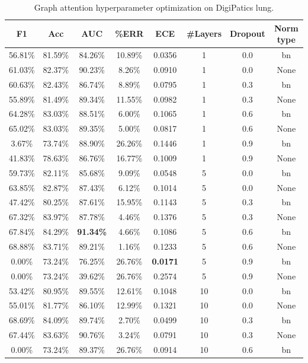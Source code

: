 \begin{table}[ht]
    \centering
    \caption{Graph attention hyperparameter optimization on DigiPatics lung.}
\begin{tabular}{|c|c|c|c|c|c|c|c|}
\hline
F1 & Acc & AUC & \%ERR & ECE & \#Layers & Dropout & Norm type\\ \hline
56.81\% & 81.59\% & 84.26\% & 10.89\% & 0.0356 & 1 & 0.0 & bn\\ \hline
61.03\% & 82.37\% & 90.23\% & 8.26\% & 0.0910 & 1 & 0.0 & None\\ \hline
60.63\% & 82.43\% & 86.74\% & 8.89\% & 0.0795 & 1 & 0.3 & bn\\ \hline
55.89\% & 81.49\% & 89.34\% & 11.55\% & 0.0982 & 1 & 0.3 & None\\ \hline
64.28\% & 83.03\% & 88.51\% & 6.00\% & 0.1065 & 1 & 0.6 & bn\\ \hline
65.02\% & 83.03\% & 89.35\% & 5.00\% & 0.0817 & 1 & 0.6 & None\\ \hline
3.67\% & 73.74\% & 88.90\% & 26.26\% & 0.1446 & 1 & 0.9 & bn\\ \hline
41.83\% & 78.63\% & 86.76\% & 16.77\% & 0.1009 & 1 & 0.9 & None\\ \hline
59.73\% & 82.11\% & 85.68\% & 9.09\% & 0.0548 & 5 & 0.0 & bn\\ \hline
63.85\% & 82.87\% & 87.43\% & 6.12\% & 0.1014 & 5 & 0.0 & None\\ \hline
47.42\% & 80.25\% & 87.61\% & 15.95\% & 0.1143 & 5 & 0.3 & bn\\ \hline
67.32\% & 83.97\% & 87.78\% & 4.46\% & 0.1376 & 5 & 0.3 & None\\ \hline
67.84\% & 84.29\% & \textbf{91.34\%} & 4.66\% & 0.1086 & 5 & 0.6 & bn\\ \hline
68.88\% & 83.71\% & 89.21\% & 1.16\% & 0.1233 & 5 & 0.6 & None\\ \hline
0.00\% & 73.24\% & 76.25\% & 26.76\% & \textbf{0.0171} & 5 & 0.9 & bn\\ \hline
0.00\% & 73.24\% & 39.62\% & 26.76\% & 0.2574 & 5 & 0.9 & None\\ \hline
53.42\% & 80.95\% & 89.55\% & 12.61\% & 0.1048 & 10 & 0.0 & bn\\ \hline
55.01\% & 81.77\% & 86.10\% & 12.99\% & 0.1321 & 10 & 0.0 & None\\ \hline
68.69\% & 84.09\% & 89.74\% & 2.70\% & 0.0499 & 10 & 0.3 & bn\\ \hline
67.44\% & 83.63\% & 90.76\% & 3.24\% & 0.0791 & 10 & 0.3 & None\\ \hline
0.00\% & 73.24\% & 89.37\% & 26.76\% & 0.0914 & 10 & 0.6 & bn\\ \hline

\end{tabular}
\end{table}
